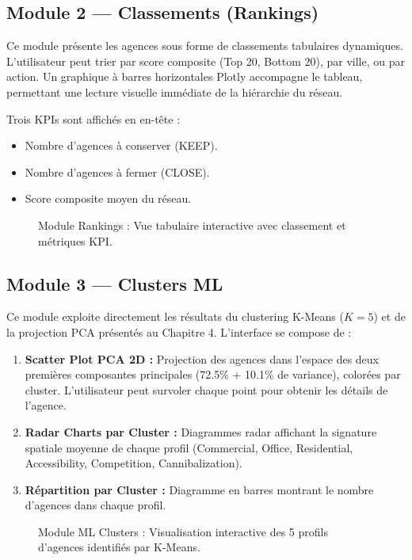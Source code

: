 \subsection{Module 2 — Classements (Rankings)}

Ce module présente les agences sous forme de classements tabulaires dynamiques. L'utilisateur peut trier par score composite (Top 20, Bottom 20), par ville, ou par action. Un graphique à barres horizontales Plotly accompagne le tableau, permettant une lecture visuelle immédiate de la hiérarchie du réseau.

Trois KPIs sont affichés en en-tête :
\begin{itemize}
    \item Nombre d'agences à conserver (KEEP).
    \item Nombre d'agences à fermer (CLOSE).
    \item Score composite moyen du réseau.
\end{itemize}

\begin{figure}[h]
    \centering
    \caption{Module Rankings : Vue tabulaire interactive avec classement et métriques KPI.}
    \label{fig:screenshot_rankings}
\end{figure}

\subsection{Module 3 — Clusters ML}

Ce module exploite directement les résultats du clustering K-Means ($K=5$) et de la projection PCA présentés au Chapitre 4. L'interface se compose de :

\begin{enumerate}
    \item \textbf{Scatter Plot PCA 2D :} Projection des agences dans l'espace des deux premières composantes principales (72.5\% + 10.1\% de variance), colorées par cluster. L'utilisateur peut survoler chaque point pour obtenir les détails de l'agence.
    \item \textbf{Radar Charts par Cluster :} Diagrammes radar affichant la signature spatiale moyenne de chaque profil (Commercial, Office, Residential, Accessibility, Competition, Cannibalization).
    \item \textbf{Répartition par Cluster :} Diagramme en barres montrant le nombre d'agences dans chaque profil.
\end{enumerate}

\begin{figure}[h]
    \centering
    \caption{Module ML Clusters : Visualisation interactive des 5 profils d'agences identifiés par K-Means.}
    \label{fig:screenshot_clusters}
\end{figure}
